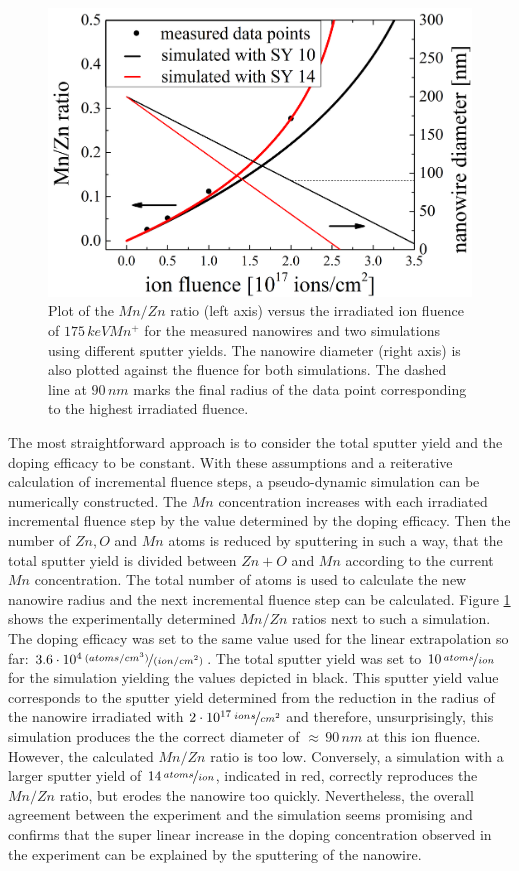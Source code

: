 \begin{figure}
	\centering
		\includegraphics[width=.5\textwidth]{images/staticsputteryield.png}
	\caption{Plot of the $Mn/Zn$ ratio (left axis) versus the irradiated ion fluence of $175\,keV Mn^+$ for the measured nanowires and two simulations using different sputter yields. The nanowire diameter (right axis) is also plotted against the fluence for both simulations. The dashed line at $90\,nm$ marks the final radius of the data point corresponding to the highest irradiated fluence.}
	\label{staticsputter}
\end{figure} 

The most straightforward approach is to consider the total sputter yield and the doping efficacy to be constant. With these assumptions and a reiterative calculation of incremental fluence steps, a pseudo-dynamic simulation can be numerically constructed. The $Mn$ concentration increases with each irradiated incremental fluence step by the value determined by the doping efficacy. Then the number of $Zn, O$ and $Mn$ atoms is reduced by sputtering in such a way, that the total sputter yield is divided between $Zn+O$ and $Mn$ according to the current $Mn$ concentration. The total number of atoms is used to calculate the new nanowire radius and the next incremental fluence step can be calculated. Figure \ref{staticsputter} shows the experimentally determined $Mn/Zn$ ratios next to such a simulation. The doping efficacy was set to the same value used for the linear extrapolation so far: $3.6\cdot10^4\,\nicefrac{(atoms/cm^3)}{(ion/cm^2)}$. The total sputter yield was set to $10\,\nicefrac{atoms}{ion}$ for the simulation yielding the values depicted in black. This sputter yield value corresponds to the sputter yield determined from the reduction in the radius of the nanowire irradiated with $2\cdot10^{17}\,\nicefrac{ions}{cm^2}$ and therefore, unsurprisingly, this simulation produces the the correct diameter of $\approx\,90\,nm$ at this ion fluence. However, the calculated $Mn/Zn$ ratio is too low. Conversely, a simulation with a larger sputter yield of $14\,\nicefrac{atoms}{ion}$, indicated in red, correctly reproduces the $Mn/Zn$ ratio, but erodes the nanowire too quickly. Nevertheless, the overall agreement between the experiment and the simulation seems promising and confirms that the super linear increase in the doping concentration observed in the experiment can be explained by the sputtering of the nanowire.

